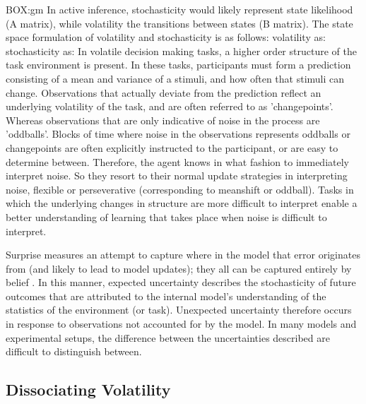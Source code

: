 \documentclass{article}
\begin{document}
BOX:gm
In active inference, stochasticity would likely represent state likelihood (A matrix), while volatility the transitions between states (B matrix).
The state space formulation of volatility and stochasticity is as follows:
volatility as:
stochasticity as:
In volatile decision making tasks, a higher order structure of the task environment is present. In these tasks, participants must form a prediction consisting of a mean and variance of a stimuli, and how often that stimuli can change. Observations that actually deviate from the prediction reflect an underlying volatility of the task, and are often referred to as 'changepoints'. Whereas observations that are only indicative of noise in the process are 'oddballs'. Blocks of time where noise in the observations represents oddballs or changepoints are often explicitly instructed to the participant, or are easy to determine between. Therefore, the agent knows in what fashion to immediately interpret noise. So they resort to their normal update strategies in interpreting noise, flexible or perseverative (corresponding to meanshift or oddball). Tasks in which the underlying changes in structure are more difficult to interpret enable a better understanding of learning that takes place when noise is difficult to interpret.

Surprise measures an attempt to capture where in the model that error originates from (and likely to lead to model updates); they all can be captured entirely by belief \citep{modirshanechi2022taxonomy}. In this manner, expected uncertainty describes the stochasticity of future outcomes that are attributed to the internal model's understanding of the statistics of the environment (or task). Unexpected uncertainty therefore occurs in response to observations not accounted for by the model. In many models and experimental setups, the difference between the uncertainties described are difficult to distinguish between.

\subsection{Dissociating Volatility}
\end{document}
